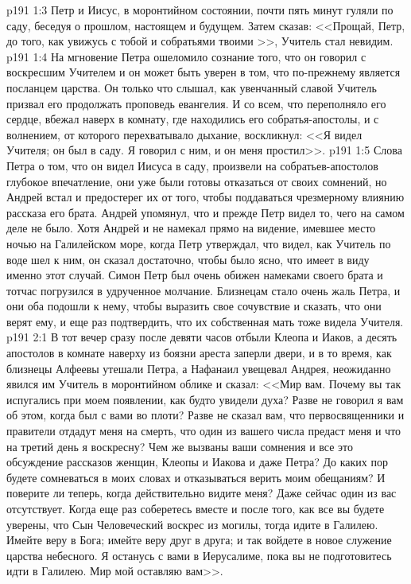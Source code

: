 \vs p191 1:3 Петр и Иисус, в моронтийном состоянии, почти пять минут гуляли по саду, беседуя о прошлом, настоящем и будущем. Затем сказав: <<Прощай, Петр, до того, как увижусь с тобой и собратьями твоими >>, Учитель стал невидим.
\vs p191 1:4 На мгновение Петра ошеломило сознание того, что он говорил с воскресшим Учителем и он может быть уверен в том, что по\hyp{}прежнему является посланцем царства. Он только что слышал, как увенчанный славой Учитель призвал его продолжать проповедь евангелия. И со всем, что переполняло его сердце, вбежал наверх в комнату, где находились его собратья\hyp{}апостолы, и с волнением, от которого перехватывало дыхание, воскликнул: <<Я видел Учителя; он был в саду. Я говорил с ним, и он меня простил>>.
\vs p191 1:5 Слова Петра о том, что он видел Иисуса в саду, произвели на собратьев\hyp{}апостолов глубокое впечатление, они уже были готовы отказаться от своих сомнений, но Андрей встал и предостерег их от того, чтобы поддаваться чрезмерному влиянию рассказа его брата. Андрей упомянул, что и прежде Петр видел то, чего на самом деле не было. Хотя Андрей и не намекал прямо на видение, имевшее место ночью на Галилейском море, когда Петр утверждал, что видел, как Учитель по воде шел к ним, он сказал достаточно, чтобы было ясно, что имеет в виду именно этот случай. Симон Петр был очень обижен намеками своего брата и тотчас погрузился в удрученное молчание. Близнецам стало очень жаль Петра, и они оба подошли к нему, чтобы выразить свое сочувствие и сказать, что они верят ему, и еще раз подтвердить, что их собственная мать тоже видела Учителя.
\vs p191 2:1 В тот вечер сразу после девяти часов отбыли Клеопа и Иаков, а десять апостолов в комнате наверху из боязни ареста заперли двери, и в то время, как близнецы Алфеевы утешали Петра, а Нафанаил увещевал Андрея, неожиданно явился им Учитель в моронтийном облике и сказал: <<Мир вам. Почему вы так испугались при моем появлении, как будто увидели духа? Разве не говорил я вам об этом, когда был с вами во плоти? Разве не сказал вам, что первосвященники и правители отдадут меня на смерть, что один из вашего числа предаст меня и что на третий день я воскресну? Чем же вызваны ваши сомнения и все это обсуждение рассказов женщин, Клеопы и Иакова и даже Петра? До каких пор будете сомневаться в моих словах и отказываться верить моим обещаниям? И поверите ли теперь, когда действительно видите меня? Даже сейчас один из вас отсутствует. Когда еще раз соберетесь вместе и после того, как все вы будете уверены, что Сын Человеческий воскрес из могилы, тогда идите в Галилею. Имейте веру в Бога; имейте веру друг в друга; и так войдете в новое служение царства небесного. Я останусь с вами в Иерусалиме, пока вы не подготовитесь идти в Галилею. Мир мой оставляю вам>>.
